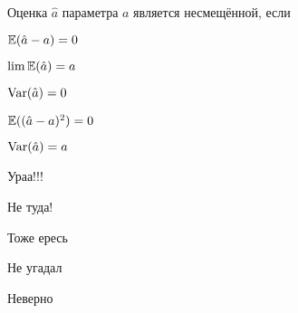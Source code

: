 
\begin{question}
Оценка \(\hat a\) параметра \(a\) является несмещённой, если
\begin{answerlist}
  \item \(\operatorname{\mathbb{E}}(\hat a - a) = 0\)
  \item \(\lim \operatorname{\mathbb{E}}(\hat a) = a\)
  \item \(\operatorname{Var}(\hat a) = 0\)
  \item \(\operatorname{\mathbb{E}}((\hat a - a)^2)=0\)
  \item \(\operatorname{Var}(\hat a) = a\)
\end{answerlist}
\end{question}

\begin{solution}
\begin{answerlist}
  \item Ураа!!!
  \item Не туда!
  \item Тоже ересь
  \item Не угадал
  \item Неверно
\end{answerlist}
\end{solution}

